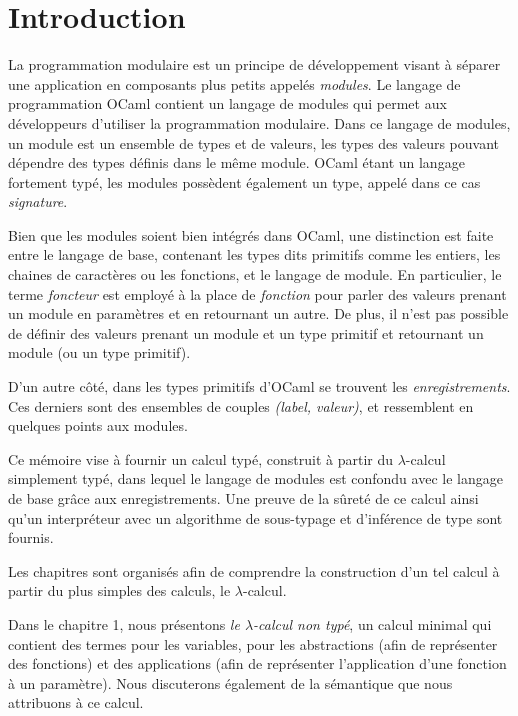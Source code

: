 \chapter{Introduction}

La programmation modulaire est un principe de développement visant à séparer une
application en composants plus petits appelés \textit{modules}. Le langage de
programmation OCaml contient un langage de modules qui permet aux développeurs
d'utiliser la programmation modulaire. Dans ce langage de modules, un module est
un ensemble de types et de valeurs, les types des valeurs pouvant dépendre des
types définis dans le même module.
OCaml étant un langage fortement typé, les modules possèdent également
un type, appelé dans ce cas \textit{signature}.

Bien que les modules soient bien intégrés dans OCaml, une
distinction est faite entre le langage de base, contenant les types dits
\og primitifs \fg{}
comme les entiers, les chaines de caractères ou les fonctions, et le
langage de module. En particulier, le terme \textit{foncteur} est employé à la
place de \textit{fonction} pour parler des valeurs prenant un module en
paramètres et en retournant un autre. De plus, il n'est pas possible de définir
des valeurs prenant un module et un type primitif et retournant un module (ou un
type primitif).

D'un autre côté, dans les types primitifs d'OCaml se trouvent les
\textit{enregistrements}. Ces derniers sont des ensembles de couples
\textit{(label, valeur)}, et ressemblent en quelques points aux modules.

Ce mémoire vise à fournir un calcul typé, construit à partir du $\lambda$-calcul
simplement typé, dans lequel le langage de modules est confondu avec le langage
de base grâce aux enregistrements. Une preuve de la sûreté de ce calcul ainsi
qu'un interpréteur avec un algorithme de sous-typage et d'inférence de type
sont fournis.

Les chapitres sont organisés afin de comprendre la construction d'un tel calcul
à partir du plus simples des calculs, le $\lambda$-calcul.

Dans le chapitre 1, nous présentons \textit{le $\lambda$-calcul non typé}, un calcul
minimal qui contient des termes pour les variables, pour les abstractions (afin
de représenter des fonctions) et des applications (afin de représenter
l'application d'une fonction à un paramètre). Nous discuterons également de la
sémantique que nous attribuons à ce calcul.


